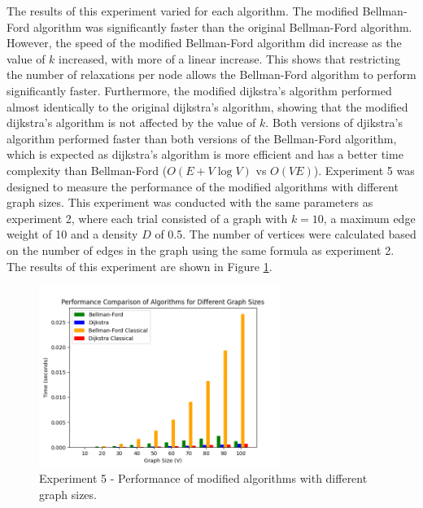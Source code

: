 \documentclass[12pt]{article}
\begin{document}
The results of this experiment varied for each algorithm. The modified Bellman-Ford algorithm was significantly faster
than the original Bellman-Ford algorithm. However, the speed of the modified Bellman-Ford algorithm did increase as the value of $k$ increased, with more of 
a linear increase. This shows that restricting the number of relaxations per node allows the Bellman-Ford algorithm to perform significantly faster. Furthermore, the modified dijkstra's algorithm performed almost identically to the original dijkstra's algorithm, showing that the modified dijkstra's algorithm is not affected by the value of $k$.
Both versions of djikstra's algorithm performed faster than both versions of the Bellman-Ford algorithm, which is expected as dijkstra's algorithm is more efficient and has a better time complexity than Bellman-Ford ($O(E + V \log V)$ vs $O(VE)$).
\smallskip
\newline
\indent
Experiment 5 was designed to measure the performance of the modified algorithms with different graph sizes.
This experiment was conducted with the same parameters as experiment 2, where each trial consisted of a graph with $k=10$, a maximum edge weight of 10 and a density $D$ of 0.5. The number of vertices were calculated based on the number of edges in the graph using the same formula as experiment 2.
The results of this experiment are shown in Figure \ref{fig:Figure 5}.

\begin{figure}[H] 
    \centering
    \includegraphics[width=0.7\textwidth]{Figures/Performance_sizes.png} 
    \caption{\footnotesize Experiment 5 - Performance of modified algorithms with different graph sizes.}
    \label{fig:Figure 5} 
\end{figure}
\end{document}
